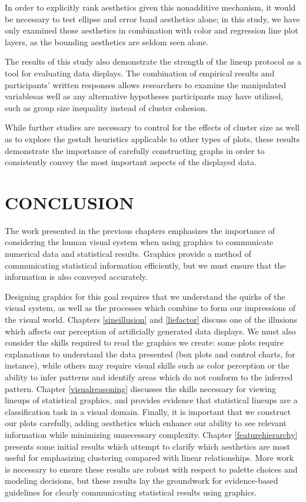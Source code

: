 \documentclass[11pt]{isuthesis}\usepackage[]{graphicx}\usepackage[]{color}
\begin{document}
In order to explicitly rank aesthetics given this nonadditive mechanism, it would be necessary to test ellipse and error band aesthetics alone; in this study, we have only examined those aesthetics in combination with color and regression line plot layers, as the bounding aesthetics are seldom seen alone. 

The results of this study also demonstrate the strength of the lineup protocol as a tool for evaluating data displays. The combination of empirical results and participants' written responses allows researchers to examine the manipulated variablesas well as any alternative hypotheses participants may have utilized, such as group size inequality instead of cluster cohesion. 

While further studies are necessary to control for the effects of cluster size as well as to explore the gestalt heuristics applicable to other types of plots, these results demonstrate the importance of carefully constructing graphs in order to consistently convey the most important aspects of the displayed data. 

\chapter{CONCLUSION}
The work presented in the previous chapters emphasizes the importance of considering the human visual system when using graphics to communicate numerical data and statistical results. Graphics provide a method of communicating statistical information efficiently, but we must ensure that the information is also conveyed accurately. 

Designing graphics for this goal requires that we understand the quirks of the visual system, as well as the processes which combine to form our impressions of the visual world. Chapters \ref{sineillusion} and \ref{liefactor} discuss one of the illusions which affects our perception of artificially generated data displays. We must also consider the skills required to read the graphics we create: some plots require explanations to understand the data presented (box plots and control charts, for instance), while others may require visual skills such as color perception or the ability to infer patterns and identify areas which do not conform to the inferred pattern. Chapter \ref{visualreasoning} discusses the skills necessary for viewing lineups of statistical graphics, and provides evidence that statistical lineups are a classification task in a visual domain. Finally, it is important that we construct our plots carefully, adding aesthetics which enhance our ability to see relevant information while minimizing unnecessary complexity. Chapter \ref{featurehierarchy} presents some initial results which attempt to clarify which aesthetics are most useful for emphasizing clustering compared with linear relationships. More work is necessary to ensure these results are robust with respect to palette choices and modeling decisions, but these results lay the groundwork for evidence-based guidelines for clearly communicating statistical results using graphics.
\end{document}
